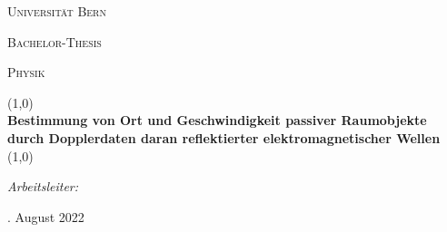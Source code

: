 
\begin{titlepage}
\begin{center}
\vspace*{2.5cm}

\textsc{\large Universität Bern}


\vspace{1.2cm}
\textsc{Bachelor-Thesis}

\vspace{0.5cm}
\textsc{\small Physik}

\vspace{-0.5cm}
\Large
\renewcommand{\baselinestretch}{1.8}
\line(1,0){\textwidth} \\
\vspace{0.25cm}
\textbf{Bestimmung von Ort und Geschwindigkeit passiver Raumobjekte durch Dopplerdaten daran reflektierter elektromagnetischer Wellen} \\
\vspace{-0.3cm}
\line(1,0){\textwidth} %
\normalsize

\vspace{0.9cm}

 \hfill \raggedright{\textit{Arbeitsleiter:}} \\
\vspace{-0.4cm}
 \hfill {}

\vfill

. August 2022
%    
%
%    
    
\end{center}
\end{titlepage}